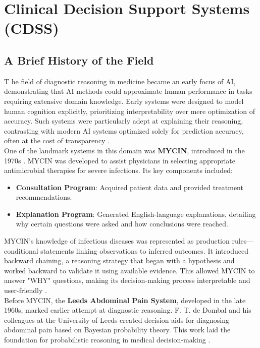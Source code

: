 \section{Clinical Decision Support Systems (CDSS)}
\label{sec:sota}
\subsection{A Brief History of the Field}
\lettrine{T}{ }he field of diagnostic reasoning in medicine became an early focus of AI, demonstrating that AI methods could approximate human performance in tasks requiring extensive domain knowledge. Early systems were designed to model human cognition explicitly, prioritizing interpretability over mere optimization of accuracy. Such systems were particularly adept at explaining their reasoning, contrasting with modern AI systems optimized solely for prediction accuracy, often at the cost of transparency \cite{cohen2022introducing}.\\[\baselineskip]

\noindent One of the landmark systems in this domain was \textcolor{TUMRed}{\textbf{MYCIN}}, introduced in the 1970s \cite{cohen2022intelligent, shortliffe2012computer, shortliffe1975model}. MYCIN was developed to assist physicians in selecting appropriate antimicrobial therapies for severe infections. Its key components included:
\begin{itemize}
    \item \textcolor{TUMRed}{\textbf{Consultation Program}}: Acquired patient data and provided treatment recommendations.
    \item \textcolor{TUMRed}{\textbf{Explanation Program}}: Generated English-language explanations, detailing why certain questions were asked and how conclusions were reached.
\end{itemize}

\noindent MYCIN's knowledge of infectious diseases was represented as production rules---conditional statements linking observations to inferred outcomes. It introduced backward chaining, a reasoning strategy that began with a hypothesis and worked backward to validate it using available evidence. This allowed MYCIN to answer "WHY" questions, making its decision-making process interpretable and user-friendly \cite{shortliffe1975model, musen2021clinical}.\\[\baselineskip]

\noindent Before MYCIN, the \textcolor{TUMRed}{\textbf{Leeds Abdominal Pain System}}, developed in the late 1960s, marked earlier attempt at diagnostic reasoning. F. T. de Dombal and his colleagues at the University of Leeds created decision aids for diagnosing abdominal pain based on Bayesian probability theory. This work laid the foundation for probabilistic reasoning in medical decision-making \cite{musen2021clinical}.\\[\baselineskip]

